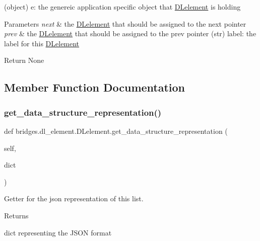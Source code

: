 (object) e\+: the genereic application specific object that \hyperlink{classbridges_1_1dl__element_1_1_d_lelement}{D\+Lelement} is holding 
\begin{DoxyParams}{Parameters}
{\em next} & the \hyperlink{classbridges_1_1dl__element_1_1_d_lelement}{D\+Lelement} that should be assigned to the next pointer \\
\hline
{\em prev} & the \hyperlink{classbridges_1_1dl__element_1_1_d_lelement}{D\+Lelement} that should be assigned to the prev pointer (str) label\+: the label for this \hyperlink{classbridges_1_1dl__element_1_1_d_lelement}{D\+Lelement} \\
\hline
\end{DoxyParams}
\begin{DoxyParagraph}{Return}
None 
\end{DoxyParagraph}


\subsection{Member Function Documentation}
\mbox{\label{classbridges_1_1dl__element_1_1_d_lelement_abcae653ca8e9590c594910bad148ddf2}} 
\subsubsection{\texorpdfstring{get\+\_\+data\+\_\+structure\+\_\+representation()}{get\_data\_structure\_representation()}}
{\footnotesize\ttfamily def bridges.\+dl\+\_\+element.\+D\+Lelement.\+get\+\_\+data\+\_\+structure\+\_\+representation (\begin{DoxyParamCaption}\item[{}]{self,  }\item[{}]{dict }\end{DoxyParamCaption})}



Getter for the json representation of this list. 

\begin{DoxyReturn}{Returns}


dict representing the J\+S\+ON format 
\end{DoxyReturn}
\mbox{\label{classbridges_1_1dl__element_1_1_d_lelement_a5fb177ed67b75e606ac303f7a972d301}} 
